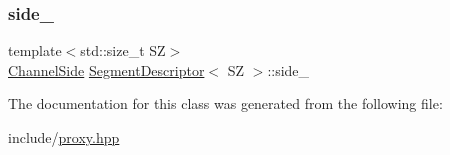 \mbox{\label{classSegmentDescriptor_a0e3fbc1517507dd8ce948232cfd5508b}} 
\subsubsection{\texorpdfstring{side\+\_\+}{side\_}}
{\footnotesize\ttfamily template$<$std\+::size\+\_\+t SZ$>$ \\
\hyperlink{proxy_8hpp_a249fda9ad200a554304ecf8de90d6877}{Channel\+Side} \hyperlink{classSegmentDescriptor}{Segment\+Descriptor}$<$ SZ $>$\+::side\+\_\+\hspace{0.3cm}{\ttfamily [private]}}



The documentation for this class was generated from the following file\+:\begin{DoxyCompactItemize}
\item 
include/\hyperlink{proxy_8hpp}{proxy.\+hpp}\end{DoxyCompactItemize}
